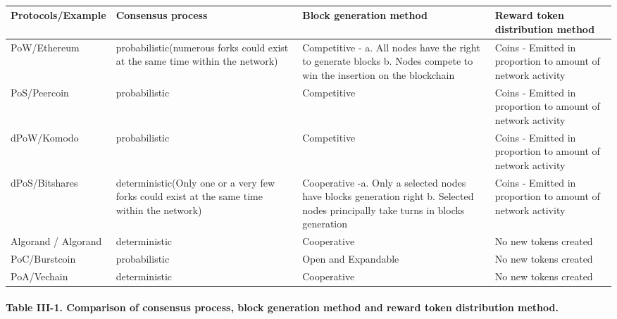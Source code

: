 \documentclass[doublespacing]{bmcart}
\begin{document}
\begin{CJK*}{UTF8}{gbsn}
\paragraph{}
\begin{tabular}{p{2cm}p{3cm}p{3cm}p{3cm}}
\hline
Protocols/E\-xample  & Consensus process & Block generation method & Reward token distribution method \\ \hline

PoW/Ethe\-reum  
& probabilistic(nume\-rous forks could exist at the same time within the network) 
& Competitive - \newline a. All nodes have the right to generate blocks \newline b. Nodes compete to win the insertion on the blockchain 
& Coins - Emitted in proportion to amount of network activity \\ \hline

PoS/Peercoin 
& probabilistic
& Competitive 
& Coins - Emitted in proportion to amount of network activity \\ \hline

dPoW/Komo\-do  
& probabilistic
& Competitive 
&  Coins - Emitted in proportion to amount of network activity\\ \hline

dPoS/\newline Bitshares  
& deterministic(Only one or a very few forks could exist at the same time within the network)
& Cooperative -\newline a. Only a selected nodes have blocks generation right \newline b. Selected nodes principally take turns in blocks generation 
& Coins - Emitted in proportion to amount of network activity \\ \hline

Algorand / Algorand
& deterministic 
& Cooperative 
& No new tokens created \\ \hline

PoC/Burst\-coin & probabilistic & Open and Expandable & No new tokens created \\ \hline
PoA/Vechain & deterministic & Cooperative & No new tokens created \\ \hline
\end{tabular}
\paragraph{Table III-1. Comparison of consensus process, block generation method and reward token distribution method.}

\end{CJK*}
\end{document}

